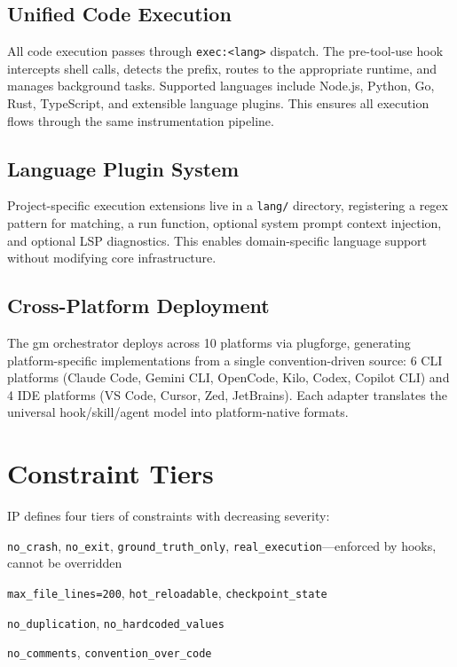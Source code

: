 \documentclass[11pt,twocolumn]{article}
\begin{document}
\subsection{Unified Code Execution}

All code execution passes through \texttt{exec:<lang>} dispatch. The pre-tool-use hook intercepts shell calls, detects the prefix, routes to the appropriate runtime, and manages background tasks. Supported languages include Node.js, Python, Go, Rust, TypeScript, and extensible language plugins. This ensures all execution flows through the same instrumentation pipeline.

\subsection{Language Plugin System}

Project-specific execution extensions live in a \texttt{lang/} directory, registering a regex pattern for matching, a run function, optional system prompt context injection, and optional LSP diagnostics. This enables domain-specific language support without modifying core infrastructure.

\subsection{Cross-Platform Deployment}

The gm orchestrator deploys across 10 platforms via plugforge, generating platform-specific implementations from a single convention-driven source: 6 CLI platforms (Claude Code, Gemini CLI, OpenCode, Kilo, Codex, Copilot CLI) and 4 IDE platforms (VS Code, Cursor, Zed, JetBrains). Each adapter translates the universal hook/skill/agent model into platform-native formats.

\section{Constraint Tiers}

IP defines four tiers of constraints with decreasing severity:

\begin{description}[nosep]
    \item[Tier 0 (Absolute)] \texttt{no\_crash}, \texttt{no\_exit}, \texttt{ground\_truth\_only}, \texttt{real\_execution}---enforced by hooks, cannot be overridden
    \item[Tier 1 (Quality)] \texttt{max\_file\_lines=200}, \texttt{hot\_reloadable}, \texttt{checkpoint\_state}
    \item[Tier 2 (Modularity)] \texttt{no\_duplication}, \texttt{no\_hardcoded\_values}
    \item[Tier 3 (Style)] \texttt{no\_comments}, \texttt{convention\_over\_code}
\end{description}
\end{document}
